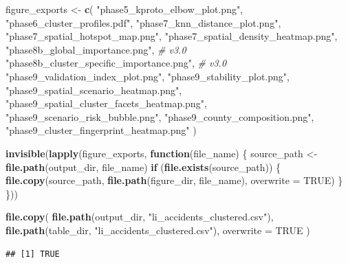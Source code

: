 \documentclass[
]{article}
\newenvironment{Shaded}{\begin{snugshade}}{\end{snugshade}}
\newcommand{\AttributeTok}[1]{\textcolor[rgb]{0.13,0.29,0.53}{#1}}
\newcommand{\CommentTok}[1]{\textcolor[rgb]{0.56,0.35,0.01}{\textit{#1}}}
\newcommand{\ConstantTok}[1]{\textcolor[rgb]{0.56,0.35,0.01}{#1}}
\newcommand{\ControlFlowTok}[1]{\textcolor[rgb]{0.13,0.29,0.53}{\textbf{#1}}}
\newcommand{\FunctionTok}[1]{\textcolor[rgb]{0.13,0.29,0.53}{\textbf{#1}}}
\newcommand{\NormalTok}[1]{#1}
\newcommand{\OtherTok}[1]{\textcolor[rgb]{0.56,0.35,0.01}{#1}}
\newcommand{\StringTok}[1]{\textcolor[rgb]{0.31,0.60,0.02}{#1}}
\begin{document}
\begin{Shaded}
\begin{Highlighting}[]
\NormalTok{figure\_exports }\OtherTok{\textless{}{-}} \FunctionTok{c}\NormalTok{(}
  \StringTok{"phase5\_kproto\_elbow\_plot.png"}\NormalTok{,}
  \StringTok{"phase6\_cluster\_profiles.pdf"}\NormalTok{,}
  \StringTok{"phase7\_knn\_distance\_plot.png"}\NormalTok{,}
  \StringTok{"phase7\_spatial\_hotspot\_map.png"}\NormalTok{,}
  \StringTok{"phase7\_spatial\_density\_heatmap.png"}\NormalTok{,}
  \StringTok{"phase8b\_global\_importance.png"}\NormalTok{,                }\CommentTok{\# v3.0}
  \StringTok{"phase8b\_cluster\_specific\_importance.png"}\NormalTok{,       }\CommentTok{\# v3.0}
  \StringTok{"phase9\_validation\_index\_plot.png"}\NormalTok{,}
  \StringTok{"phase9\_stability\_plot.png"}\NormalTok{,}
  \StringTok{"phase9\_spatial\_scenario\_heatmap.png"}\NormalTok{,}
  \StringTok{"phase9\_spatial\_cluster\_facets\_heatmap.png"}\NormalTok{,}
  \StringTok{"phase9\_scenario\_risk\_bubble.png"}\NormalTok{,}
  \StringTok{"phase9\_county\_composition.png"}\NormalTok{,}
  \StringTok{"phase9\_cluster\_fingerprint\_heatmap.png"}
\NormalTok{)}

\FunctionTok{invisible}\NormalTok{(}\FunctionTok{lapply}\NormalTok{(figure\_exports, }\ControlFlowTok{function}\NormalTok{(file\_name) \{}
\NormalTok{  source\_path }\OtherTok{\textless{}{-}} \FunctionTok{file.path}\NormalTok{(output\_dir, file\_name)}
  \ControlFlowTok{if}\NormalTok{ (}\FunctionTok{file.exists}\NormalTok{(source\_path)) \{}
    \FunctionTok{file.copy}\NormalTok{(source\_path, }\FunctionTok{file.path}\NormalTok{(figure\_dir, file\_name), }\AttributeTok{overwrite =} \ConstantTok{TRUE}\NormalTok{)}
\NormalTok{  \}}
\NormalTok{\}))}

\FunctionTok{file.copy}\NormalTok{(}
  \FunctionTok{file.path}\NormalTok{(output\_dir, }\StringTok{"li\_accidents\_clustered.csv"}\NormalTok{),}
  \FunctionTok{file.path}\NormalTok{(table\_dir, }\StringTok{"li\_accidents\_clustered.csv"}\NormalTok{),}
  \AttributeTok{overwrite =} \ConstantTok{TRUE}
\NormalTok{)}
\end{Highlighting}
\end{Shaded}

\begin{verbatim}
## [1] TRUE
\end{verbatim}
\end{document}
